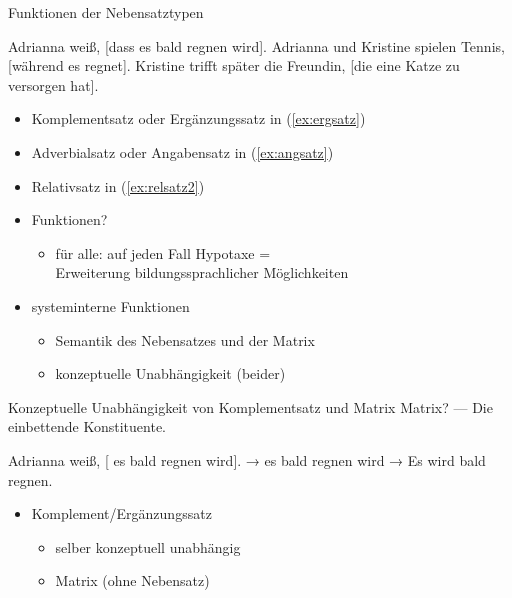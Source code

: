 \begin{frame}
  {Funktionen der Nebensatztypen}
  \pause
  \begin{exe}
    \ex Adrianna weiß, [\alert{dass es bald regnen wird}].\label{ex:ergsatz}
    \pause
    \ex Adrianna und Kristine spielen Tennis, [\alert{während es regnet}].\label{ex:angsatz}
    \pause
    \ex Kristine trifft später die Freundin, [\alert{die eine Katze zu versorgen hat}].\label{ex:relsatz2}
  \end{exe}
  \pause
  \Halbzeile
  \begin{itemize}[<+->]
    \item \alert{Komplementsatz} oder \alert{Ergänzungssatz} in (\ref{ex:ergsatz})
    \item \alert{Adverbialsatz} oder \alert{Angabensatz} in (\ref{ex:angsatz})
    \item \alert{Relativsatz} in (\ref{ex:relsatz2})
      \Zeile
    \item Funktionen?
      \begin{itemize}[<+->]
        \item für alle: auf jeden Fall \alert{Hypotaxe =\\
          Erweiterung bildungssprachlicher Möglichkeiten}
      \end{itemize}
    \Halbzeile
    \item systeminterne Funktionen
      \begin{itemize}[<+->]
        \item Semantik des Nebensatzes und der Matrix
        \item konzeptuelle Unabhängigkeit (beider)
      \end{itemize}
  \end{itemize}
\end{frame}

\begin{frame}
  {Konzeptuelle Unabhängigkeit von Komplementsatz und Matrix}
  \pause
  \alert{Matrix}? --- Die \alert{einbettende} Konstituente.\\
  \pause\Halbzeile
  \begin{exe}
    \ex
    \begin{xlist}
      \ex Adrianna weiß, [ \alert{es bald regnen wird}].
      \pause
      \ex → \alert{es bald regnen wird}
      \pause
      \ex → \alert{Es wird bald regnen.}
    \end{xlist}
    \pause
  \end{exe}
  \pause\Halbzeile
  \begin{itemize}[<+->]
    \item Komplement\slash Ergänzungssatz
      \begin{itemize}[<+->]
        \item selber \alert{konzeptuell unabhängig}
        \item Matrix  (ohne Nebensatz)
      \end{itemize}
  \end{itemize}
\end{frame}

